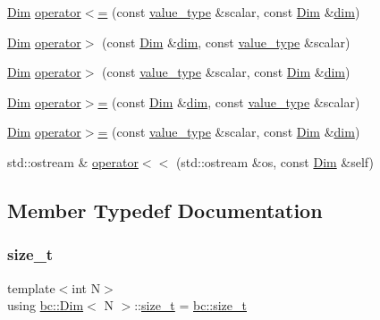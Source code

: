 \begin{DoxyCompactItemize}
\item 
\hyperlink{structbc_1_1Dim}{Dim} \hyperlink{structbc_1_1Dim_a618b61edf2f4a1214b92c258e402db2f}{operator$<$=} (const \hyperlink{structbc_1_1Dim_af59ff554825273cf6bd9619b2c78c196}{value\+\_\+type} \&scalar, const \hyperlink{structbc_1_1Dim}{Dim} \&\hyperlink{structbc_1_1Dim_adccb44583ec5a299e67b3f780dda7efc}{dim})
\item 
\hyperlink{structbc_1_1Dim}{Dim} \hyperlink{structbc_1_1Dim_a4d49593eb2ea8e5740b3a8c62385e84e}{operator$>$} (const \hyperlink{structbc_1_1Dim}{Dim} \&\hyperlink{structbc_1_1Dim_adccb44583ec5a299e67b3f780dda7efc}{dim}, const \hyperlink{structbc_1_1Dim_af59ff554825273cf6bd9619b2c78c196}{value\+\_\+type} \&scalar)
\item 
\hyperlink{structbc_1_1Dim}{Dim} \hyperlink{structbc_1_1Dim_a6d3c8956b541ffc74263b19009790829}{operator$>$} (const \hyperlink{structbc_1_1Dim_af59ff554825273cf6bd9619b2c78c196}{value\+\_\+type} \&scalar, const \hyperlink{structbc_1_1Dim}{Dim} \&\hyperlink{structbc_1_1Dim_adccb44583ec5a299e67b3f780dda7efc}{dim})
\item 
\hyperlink{structbc_1_1Dim}{Dim} \hyperlink{structbc_1_1Dim_ad522ba0026531e57284e6b93e7b494d5}{operator$>$=} (const \hyperlink{structbc_1_1Dim}{Dim} \&\hyperlink{structbc_1_1Dim_adccb44583ec5a299e67b3f780dda7efc}{dim}, const \hyperlink{structbc_1_1Dim_af59ff554825273cf6bd9619b2c78c196}{value\+\_\+type} \&scalar)
\item 
\hyperlink{structbc_1_1Dim}{Dim} \hyperlink{structbc_1_1Dim_a8e4a784d05e1b7fb4afc012d78ac23a5}{operator$>$=} (const \hyperlink{structbc_1_1Dim_af59ff554825273cf6bd9619b2c78c196}{value\+\_\+type} \&scalar, const \hyperlink{structbc_1_1Dim}{Dim} \&\hyperlink{structbc_1_1Dim_adccb44583ec5a299e67b3f780dda7efc}{dim})
\item 
std\+::ostream \& \hyperlink{structbc_1_1Dim_afaa96bc6b1e916ec02928e3dcae05ad6}{operator$<$$<$} (std\+::ostream \&os, const \hyperlink{structbc_1_1Dim}{Dim} \&self)
\end{DoxyCompactItemize}


\subsection{Member Typedef Documentation}
\mbox{\label{structbc_1_1Dim_a8c7c7ae0cd96c3923e76097089747290}} 
\subsubsection{\texorpdfstring{size\+\_\+t}{size\_t}}
{\footnotesize\ttfamily template$<$int N$>$ \\
using \hyperlink{structbc_1_1Dim}{bc\+::\+Dim}$<$ N $>$\+::\hyperlink{structbc_1_1Dim_a8c7c7ae0cd96c3923e76097089747290}{size\+\_\+t} =  \hyperlink{namespacebc_aaf8e3fbf99b04b1b57c4f80c6f55d3c5}{bc\+::size\+\_\+t}}

